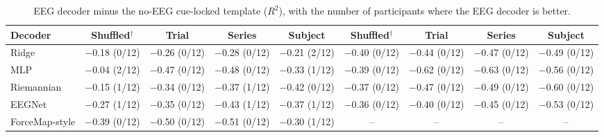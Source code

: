 \begin{table}[t]
\centering
\caption{EEG decoder minus the no-EEG cue-locked template ($R^2$), with the number of participants where the EEG decoder is better.}
\label{tab:template}
\footnotesize
\setlength{\tabcolsep}{3pt}
\begin{tabular}{lcccccccc}
\toprule
Decoder & Shuffled$^\dagger$ & Trial & Series & Subject & Shuffled$^\dagger$ & Trial & Series & Subject \\
\midrule
Ridge & $-$0.18 (0/12) & $-$0.26 (0/12) & $-$0.28 (0/12) & $-$0.21 (2/12) & $-$0.40 (0/12) & $-$0.44 (0/12) & $-$0.47 (0/12) & $-$0.49 (0/12) \\
MLP & $-$0.04 (2/12) & $-$0.47 (0/12) & $-$0.48 (0/12) & $-$0.33 (1/12) & $-$0.39 (0/12) & $-$0.62 (0/12) & $-$0.63 (0/12) & $-$0.56 (0/12) \\
Riemannian & $-$0.15 (1/12) & $-$0.34 (0/12) & $-$0.37 (1/12) & $-$0.42 (0/12) & $-$0.37 (0/12) & $-$0.47 (0/12) & $-$0.49 (0/12) & $-$0.60 (0/12) \\
EEGNet & $-$0.27 (1/12) & $-$0.35 (0/12) & $-$0.43 (1/12) & $-$0.37 (1/12) & $-$0.36 (0/12) & $-$0.40 (0/12) & $-$0.45 (0/12) & $-$0.53 (0/12) \\
ForceMap-style & $-$0.39 (0/12) & $-$0.50 (0/12) & $-$0.51 (0/12) & $-$0.30 (1/12) & -- & -- & -- & -- \\
\bottomrule
\end{tabular}
\end{table}
